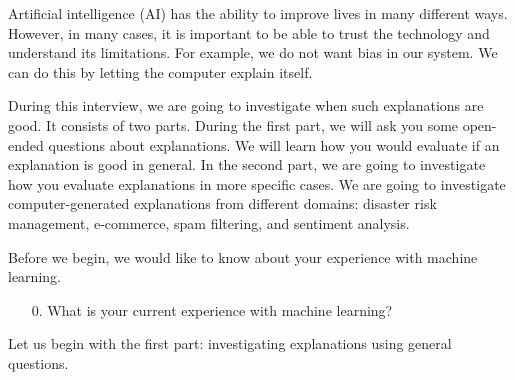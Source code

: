 \documentclass{article}
\title{\thesistitle}
\author{\thesisauthorfirst\space\thesisauthorsecond}
\date{\thesisdate}
\theoremstyle{definition}
\theoremstyle{remark}
\begin{document}
Artificial intelligence (AI) has the ability to improve lives in many different ways. However, in many cases, it is important to be able to trust the technology and understand its limitations. For example, we do not want bias in our system. We can do this by letting the computer explain itself.

During this interview, we are going to investigate when such explanations are good. It consists of two parts. During the first part, we will ask you some open-ended questions about explanations. We will learn how you would evaluate if an explanation is good in general. In the second part, we are going to investigate how you evaluate explanations in more specific cases. We are going to investigate computer-generated explanations from different domains: disaster risk management, e-commerce, spam filtering, and sentiment analysis.

Before we begin, we would like to know about your experience with machine learning.

\begin{itemize}
    \item[0.] What is your current experience with machine learning?
\end{itemize}

Let us begin with the first part: investigating explanations using general questions.

\\\\
\end{document}

